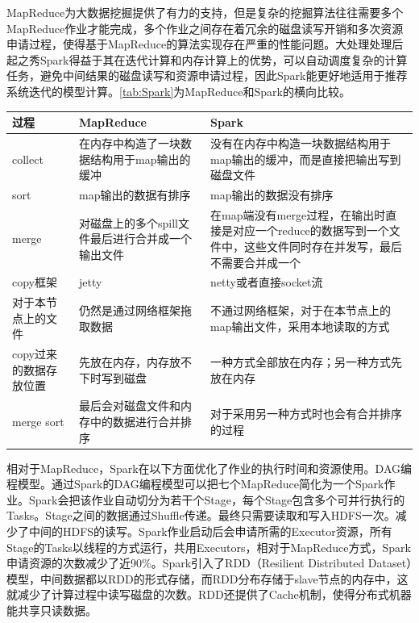    MapReduce为大数据挖掘提供了有力的支持，但是复杂的挖掘算法往往需要多个MapReduce作业才能完成，多个作业之间存在着冗余的磁盘读写开销和多次资源申请过程，使得基于MapReduce的算法实现存在严重的性能问题。大处理处理后起之秀Spark得益于其在迭代计算和内存计算上的优势，可以自动调度复杂的计算任务，避免中间结果的磁盘读写和资源申请过程，因此Spark能更好地适用于推荐系统迭代的模型计算。\autoref{tab:Spark}为MapReduce和Spark的横向比较。
    \begin{table}[htp]
    \centering
    \label{tab:Spark}
    \begin{tabular}{ |p{3cm}|p{5cm}|p{5cm}| } \hline
     过程 & MapReduce & Spark \\ \hline
     collect & 在内存中构造了一块数据结构用于map输出的缓冲 & 没有在内存中构造一块数据结构用于map输出的缓冲，而是直接把输出写到磁盘文件 \\ \hline
     sort & map输出的数据有排序 & map输出的数据没有排序 \\ \hline
     merge & 对磁盘上的多个spill文件最后进行合并成一个输出文件 & 在map端没有merge过程，在输出时直接是对应一个reduce的数据写到一个文件中，这些文件同时存在并发写，最后不需要合并成一个 \\ \hline
     copy框架 & jetty & netty或者直接socket流 \\ \hline
     对于本节点上的文件 & 仍然是通过网络框架拖取数据 & 不通过网络框架，对于在本节点上的map输出文件，采用本地读取的方式\\ \hline
     copy过来的数据存放位置 & 先放在内存，内存放不下时写到磁盘 & 一种方式全部放在内存；另一种方式先放在内存\\ \hline
     merge sort & 最后会对磁盘文件和内存中的数据进行合并排序 & 对于采用另一种方式时也会有合并排序的过程\\ \hline
    \end{tabular}
    \end{table}
    相对于MapReduce，Spark在以下方面优化了作业的执行时间和资源使用。DAG编程模型。通过Spark的DAG编程模型可以把七个MapReduce简化为一个Spark作业。Spark会把该作业自动切分为若干个Stage，每个Stage包含多个可并行执行的Tasks。Stage之间的数据通过Shuffle传递。最终只需要读取和写入HDFS一次。减少了中间的HDFS的读写。Spark作业启动后会申请所需的Executor资源，所有Stage的Tasks以线程的方式运行，共用Executors，相对于MapReduce方式，Spark申请资源的次数减少了近90\%。Spark引入了RDD（Resilient Distributed Dataset）模型，中间数据都以RDD的形式存储，而RDD分布存储于slave节点的内存中，这就减少了计算过程中读写磁盘的次数。RDD还提供了Cache机制，使得分布式机器能共享只读数据。
    
